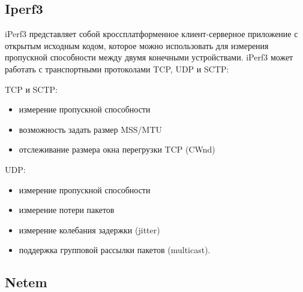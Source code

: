 \subsection{Iperf3}

iPerf3 представляет собой кроссплатформенное клиент-серверное приложение с открытым исходным кодом,
которое можно использовать для измерения пропускной способности между
двумя конечными устройствами. iPerf3 может работать с транспортными протоколами TCP, UDP и SCTP:

TCP и SCTP:

\begin{itemize}

\item измерение пропускной способности
\item возможность задать размер MSS/MTU
\item отслеживание размера окна перегрузки TCP (CWnd)

\end{itemize}

UDP:
\begin{itemize}
\item измерение пропускной способности
\item измерение потери пакетов
\item измерение колебания задержки (jitter)
\item поддержка групповой рассылки пакетов (multicast).
\end{itemize}

\subsection{Netem}


